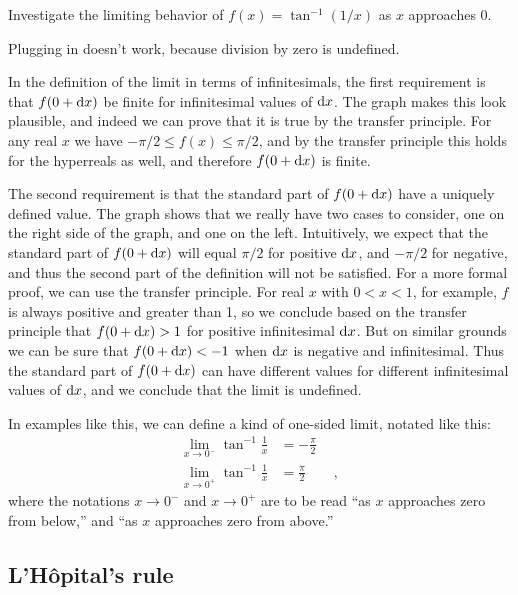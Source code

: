 \begin{eg}\label{eg:limit-two-sides}
\egquestion Investigate the limiting behavior of $f(x)=\tan^{-1}(1/x)$ as $x$ approaches 0.

\eganswer Plugging in doesn't work, because division by zero is undefined.

In the definition of the limit in terms of infinitesimals, the first requirement is that $f(0+\textup{d} x)$ be
finite for infinitesimal values of $\textup{d} x$. The graph makes this look plausible, and indeed we can prove that
it is true by the transfer principle. For any real $x$ we have $-\pi/2 \le f(x) \le \pi/2$, and
by the transfer principle this holds for the hyperreals as well, and therefore $f(0+\textup{d} x)$ is finite.

The second requirement is that the standard part of $f(0+\textup{d} x)$ have a uniquely defined value.
The graph shows that we really have two cases to consider, one on the right side of the graph, and one on the left.
Intuitively, we expect that the standard part of $f(0+\textup{d} x)$ will equal $\pi/2$ for positive $\textup{d} x$, and
$-\pi/2$ for negative, and thus the second part of the definition will not be satisfied. For a more formal proof,
we can use the transfer principle.
For real $x$ with $0<x<1$, for example, $f$ is always positive and greater than 1, so we conclude based on the transfer principle
that $f(0+\textup{d} x)>1$ for positive infinitesimal $\textup{d} x$. But on similar grounds we can be sure that  $f(0+\textup{d} x)<-1$
when $\textup{d} x$ is negative and infinitesimal. Thus the standard part of $f(0+\textup{d} x)$ can have different values for
different infinitesimal values of $\textup{d} x$, and we conclude that the limit is undefined.

In examples like this, we can define a kind of one-sided limit, notated like this:
\begin{align*}
  \lim_{x\rightarrow 0^{-}} \tan^{-1}\frac{1}{x} &= -\frac{\pi}{2} \\
  \lim_{x\rightarrow 0^{+}} \tan^{-1}\frac{1}{x} &= \frac{\pi}{2} \qquad ,
\end{align*}
where the notations $x\rightarrow 0^{-}$ and $x\rightarrow 0^{+}$ are to be read ``as $x$ approaches zero from
below,'' and ``as $x$ approaches zero from above.''
\end{eg}

\subsection{L'H\^{o}pital's rule}

